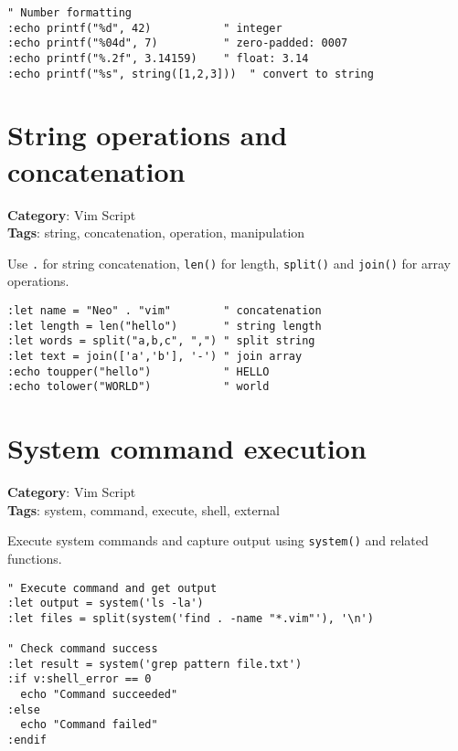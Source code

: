 {{{{{{{{{{{{{{{{{{\begin{Exa*}{}
\begin{Verbatim}[fontsize=\footnotesize, breaklines, breakanywhere]
" Number formatting
:echo printf("%d", 42)           " integer
:echo printf("%04d", 7)          " zero-padded: 0007
:echo printf("%.2f", 3.14159)    " float: 3.14
:echo printf("%s", string([1,2,3]))  " convert to string
\end{Verbatim}
\end{Exa*}

\section{String operations and concatenation}

\textbf{Category}: Vim Script\\ \textbf{Tags}: string, concatenation, operation, manipulation
\vspace{0.5cm}

Use {\footnotesize \Verb§.§} for string concatenation, {\footnotesize \Verb§len()§} for length, {\footnotesize \Verb§split()§} and {\footnotesize \Verb§join()§} for array operations.

\begin{Exa*}{}
\begin{Verbatim}[fontsize=\footnotesize, breaklines, breakanywhere]
:let name = "Neo" . "vim"        " concatenation
:let length = len("hello")       " string length
:let words = split("a,b,c", ",") " split string
:let text = join(['a','b'], '-') " join array
:echo toupper("hello")           " HELLO
:echo tolower("WORLD")           " world
\end{Verbatim}
\end{Exa*}

\section{System command execution}

\textbf{Category}: Vim Script\\ \textbf{Tags}: system, command, execute, shell, external
\vspace{0.5cm}

Execute system commands and capture output using {\footnotesize \Verb§system()§} and related functions.

\begin{Exa*}{}
\begin{Verbatim}[fontsize=\footnotesize, breaklines, breakanywhere]
" Execute command and get output
:let output = system('ls -la')
:let files = split(system('find . -name "*.vim"'), '\n')

" Check command success
:let result = system('grep pattern file.txt')
:if v:shell_error == 0
  echo "Command succeeded"
:else
  echo "Command failed"
:endif
\end{Verbatim}
\end{Exa*}

}}}}}}}}}}}}}}}}}}
